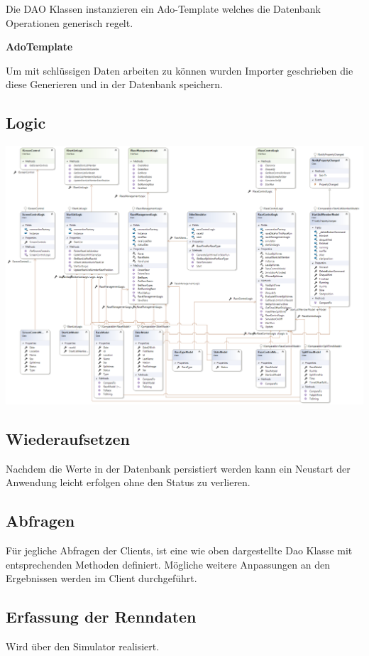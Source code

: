 \documentclass[a4paper, 12pt]{article}
\begin{document}
	Die DAO Klassen instanzieren ein Ado-Template welches die Datenbank Operationen generisch regelt.
	
	\textbf{AdoTemplate}
	
	
	Um mit schlüssigen Daten arbeiten zu können wurden Importer geschrieben die diese Generieren und in der Datenbank speichern.
	
	\subsection{Logic}
	\includegraphics[width=.9\textwidth]{img/Logic.png}\\
	
	\subsection{Wiederaufsetzen}
	Nachdem die Werte in der Datenbank persistiert werden kann ein Neustart der Anwendung leicht erfolgen ohne den Status zu verlieren.
	
	\subsection{Abfragen}
	Für jegliche Abfragen der Clients, ist eine wie oben dargestellte Dao Klasse mit entsprechenden Methoden definiert. Mögliche weitere Anpassungen an den Ergebnissen werden im Client durchgeführt.
	
	\subsection{Erfassung der Renndaten}
	Wird über den Simulator realisiert.
\end{document}
